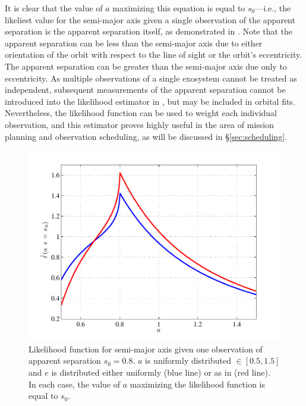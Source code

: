 It is clear that the value of $a$ maximizing this equation is equal to $s_0$---i.e., the likeliest value for the semi-major axis given a single observation of the apparent separation is the apparent separation itself, as demonstrated in .  Note that the apparent separation can be less than the semi-major axis due to either orientation of the orbit with respect to the line of sight or the orbit's eccentricity.  The apparent separation can be greater than the semi-major axis due only to eccentricity.  As multiple observations of a single exosystem cannot be treated as independent, subsequent measurements of the apparent separation cannot be introduced into the likelihood estimator in , but may be included in orbital fits.  Nevertheless, the likelihood function can be used to weight each individual observation, and this estimator proves highly useful in the area of mission planning and observation scheduling, as will be discussed in \S\ref{sec:scheduling}.
\begin{figure}[ht]
\centering
\includegraphics[width=5.5in]{./figures/amle}
\caption[Maximum likelihood for $a$ given $s$.]{Likelihood function for semi-major axis given one observation of apparent separation $s_0 = 0.8$.  $a$ is uniformly distributed $\in [0.5, 1.5]$ and $e$ is distributed either uniformly (blue line) or as in  (red line).  In each case, the value of $a$ maximizing the likelihood function is equal to $s_0$. \label{fig:amle}}
\end{figure}

